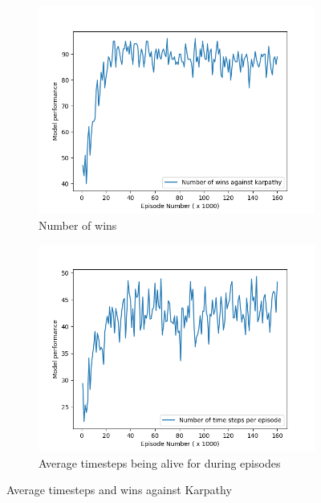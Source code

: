 \begin{figure}[ht!]
    \centering
    \begin{subfigure}{0.49\textwidth}
        \centering
        \includegraphics[scale=0.4]{figures/dqn_results_wins_vs_karpathy.png}
        \caption{Number of wins}
        \label{fig:Number of wins}
    \end{subfigure}
    \begin{subfigure}{0.49\textwidth}
        \centering
        \includegraphics[scale=0.4]{figures/ttd_per_episode_vs_karpathy.png}
        \caption{ Average timesteps being alive for during episodes}
        \label{fig: Average timesteps being alive for during episodes}
	\end{subfigure}    
    \caption{Average timesteps and wins against Karpathy}
\end{figure}
 

